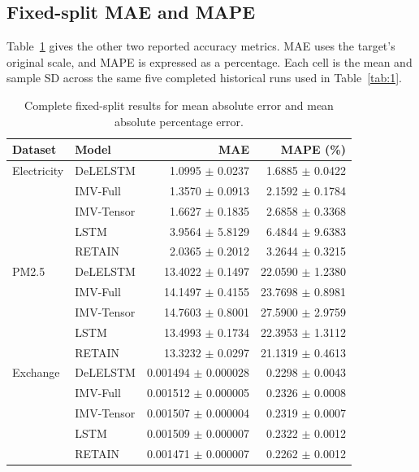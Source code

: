 \documentclass[10pt,a4paper]{article}
\begin{document}
\subsection{Fixed-split MAE and MAPE}
Table~\ref{tab:additional} gives the other two reported accuracy metrics. MAE uses the target's original scale, and MAPE is expressed as a percentage. Each cell is the mean and sample SD across the same five completed historical runs used in Table~\ref{tab:1}.
\begin{table}[H]
\centering
\caption{Complete fixed-split results for mean absolute error and mean absolute percentage error.}\label{tab:additional}
\small
\begin{tabular}{@{}llrr@{}}
\toprule
\textbf{Dataset} & \textbf{Model} & \textbf{MAE} & \textbf{MAPE (\%)} \\
\midrule
Electricity & DeLELSTM & 1.0995 \(\pm\) 0.0237 & 1.6885 \(\pm\) 0.0422 \\
 & IMV-Full & 1.3570 \(\pm\) 0.0913 & 2.1592 \(\pm\) 0.1784 \\
 & IMV-Tensor & 1.6627 \(\pm\) 0.1835 & 2.6858 \(\pm\) 0.3368 \\
 & LSTM & 3.9564 \(\pm\) 5.8129 & 6.4844 \(\pm\) 9.6383 \\
 & RETAIN & 2.0365 \(\pm\) 0.2012 & 3.2644 \(\pm\) 0.3215 \\
\addlinespace
PM2.5 & DeLELSTM & 13.4022 \(\pm\) 0.1497 & 22.0590 \(\pm\) 1.2380 \\
 & IMV-Full & 14.1497 \(\pm\) 0.4155 & 23.7698 \(\pm\) 0.8981 \\
 & IMV-Tensor & 14.7603 \(\pm\) 0.8001 & 27.5900 \(\pm\) 2.9759 \\
 & LSTM & 13.4993 \(\pm\) 0.1734 & 22.3953 \(\pm\) 1.3112 \\
 & RETAIN & 13.3232 \(\pm\) 0.0297 & 21.1319 \(\pm\) 0.4613 \\
\addlinespace
Exchange & DeLELSTM & 0.001494 \(\pm\) 0.000028 & 0.2298 \(\pm\) 0.0043 \\
 & IMV-Full & 0.001512 \(\pm\) 0.000005 & 0.2326 \(\pm\) 0.0008 \\
 & IMV-Tensor & 0.001507 \(\pm\) 0.000004 & 0.2319 \(\pm\) 0.0007 \\
 & LSTM & 0.001509 \(\pm\) 0.000007 & 0.2322 \(\pm\) 0.0012 \\
 & RETAIN & 0.001471 \(\pm\) 0.000007 & 0.2262 \(\pm\) 0.0012 \\
\bottomrule
\end{tabular}
\end{table}
\end{document}
